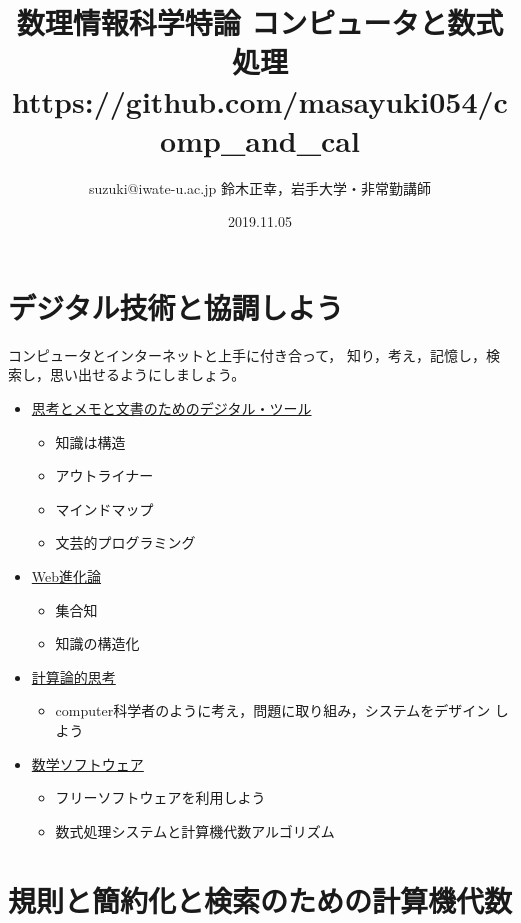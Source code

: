 \documentclass[dvipdfmx,11pt]{jarticle}
\author{suzuki@iwate-u.ac.jp 鈴木正幸，岩手大学・非常勤講師}
\date{2019.11.05}
\title{数理情報科学特論 コンピュータと数式処理\\
https://github.com/masayuki054/comp\_and\_cal
}
\begin{document}
\maketitle

\section{デジタル技術と協調しよう}
\label{sec:orgbc2b862}

コンピュータとインターネットと上手に付き合って，
知り，考え，記憶し，検索し，思い出せるようにしましょう。

\begin{itemize}
\item \href{./org/digital\_tools.org}{思考とメモと文書のためのデジタル・ツール}
\begin{itemize}
\item 知識は構造
\item アウトライナー
\item マインドマップ
\item 文芸的プログラミング
\end{itemize}

\item \href{./org/web.org}{Web進化論}
\begin{itemize}
\item 集合知
\item 知識の構造化
\end{itemize}

\item \href{./org/comp\_thinking.org}{計算論的思考}
\begin{itemize}
\item computer科学者のように考え，問題に取り組み，システムをデザイン
しよう
\end{itemize}

\item \href{./org/math-soft.org}{数学ソフトウェア}
\begin{itemize}
\item フリーソフトウェアを利用しよう
\item 数式処理システムと計算機代数アルゴリズム
\end{itemize}
\end{itemize}

\section{規則と簡約化と検索のための計算機代数}
\label{sec:orga367cf4}
\end{document}
